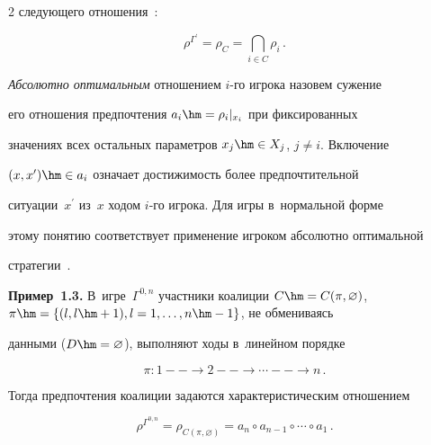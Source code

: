 \begin{multicols}{2}
сле\-ду\-юще\-го от\-но\-ше\-ния~\cite{3-vas}:

    \begin{equation}

    \rho^{\Gamma^\prime} = \rho_C = \mathop{\bigcap}\limits_{i\in C} \rho_i\,.

    \label{e1.2-vas}

    \end{equation}

    

    \textit{Абсолютно оптимальным} отношением $i$-го игрока назовем сужение 

его отношения предпочтения $a_i \hm= \rho_i\vert_{x_i}$ при фиксированных 

значениях всех остальных па\-ра\-мет\-ров $x_j\hm\in X_j$, $j\not= i$. Включение 

$(x,x^\prime)\hm\in a_i$ означает до\-сти\-жи\-мость более предпочтительной 

ситуации~$x^\prime$ из~$x$ ходом $i$-го игрока. Для игры в~нормальной форме 

этому понятию соответствует применение игроком абсолютно оптимальной 

стратегии~\cite{1-vas}.

    

    \textbf{Пример~1.3.} В~игре~$\Gamma^{0,n}$ участники коалиции $C\hm= 

C(\pi, \varnothing)$, $\pi \hm= \{ (l, l\hm+1), l=1,\ldots , n\hm-1\}$, не обмениваясь 

данными ($D\hm= \varnothing$), выполняют ходы в~линейном по\-рядке

\begin{equation}

\pi:\boxed{1}--\rightarrow \boxed{2}--\rightarrow\cdots--\rightarrow\boxed{n}\,.

\label{e1.3-vas}

\end{equation}

Тогда предпочтения коалиции задаются характеристическим от\-но\-ше\-нием

\begin{equation}

\rho^{\Gamma^{0,n}} =\rho_{C(\pi,\varnothing)} =a_n \circ a_{n-1} \circ \cdots \circ 

a_1\,.

\label{e1.4-vas}

\end{equation}


\end{multicols}
